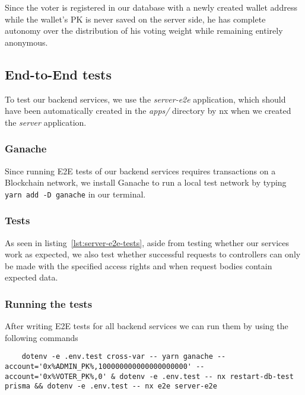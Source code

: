 Since the voter is registered in our database with a newly created wallet address while the wallet's \gls{PK} is never saved on the server side, he has complete autonomy over the distribution of his voting weight while remaining entirely anonymous.


\subsection{End-to-End tests}\label{subsec:e2e-tests}

To test our backend services, we use the \emph{server-e2e} application, which should have been automatically created in the \emph{apps/} directory by nx when we created the \emph{server} application.

\subsubsection{Ganache}

Since running \gls{E2E} tests of our backend services requires transactions on a \gls{Blockchain} network, we install Ganache to run a local test network by typing \texttt{yarn add -D ganache} in our terminal.

\subsubsection{Tests}


As seen in listing~\ref{lst:server-e2e-tests}, aside from testing whether our services work as expected, we also test whether successful requests to controllers can only be made with the specified access rights and when request bodies contain expected data.

\subsubsection{Running the tests}

After writing \gls{E2E} tests for all backend services we can run them by using the following commands


\begin{verbatim}
    dotenv -e .env.test cross-var -- yarn ganache --account='0x%ADMIN_PK%,100000000000000000000' --account='0x%VOTER_PK%,0' & dotenv -e .env.test -- nx restart-db-test prisma && dotenv -e .env.test -- nx e2e server-e2e
\end{verbatim}


